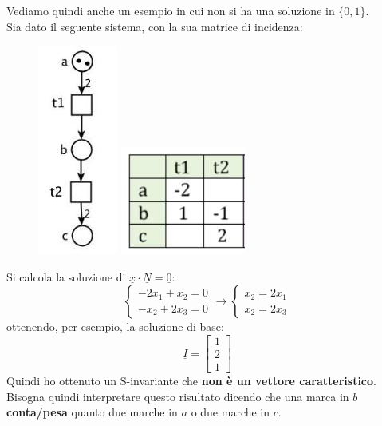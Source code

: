 \documentclass[a4paper,12pt, oneside]{book}
\begin{document}
\begin{esempio}
  Vediamo quindi anche un esempio in cui non si ha una soluzione
  in $\{0,1\}$.\\
  Sia dato il seguente sistema, con la sua matrice di incidenza:
  \begin{figure}[H]
    \centering
    \includegraphics[scale = 0.5]{img/si3.jpg}
    \includegraphics[scale = 0.5]{img/si4.jpg}
  \end{figure}
  Si calcola la soluzione di $\underline{x}\cdot \underline{N}=\underline{0}$:
  \[
    \begin{cases}
      -2x_1+x_2=0\\
      -x_2+2x_3=0
    \end{cases}\to
    \begin{cases}
      x_2=2x_1\\
      x_2=2x_3
    \end{cases}
  \]
  ottenendo, per esempio, la soluzione di base:
  \[
    \underline{I}=\left[
      \begin{matrix}
        1\\
        2\\
        1
      \end{matrix}
    \right]
  \]
  Quindi ho ottenuto un S-invariante che \textbf{non è un vettore
    caratteristico}. Bisogna quindi interpretare questo risultato dicendo che
  una marca in $b$ \textbf{conta/pesa} quanto due marche in $a$ o due marche in
  $c$.  
\end{esempio}
\end{document}
